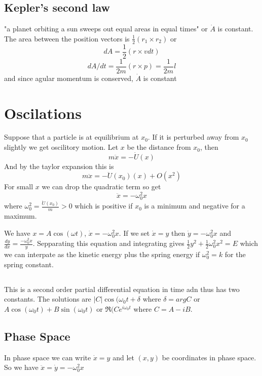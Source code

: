 \documentclass{homework}
\begin{document}
\subsection{Kepler's second law}

"a planet orbiting a sun sweeps out equal areas in equal times" or $\dot{A}$ is constant. The area between the position vectors is $\frac{1}{2}(r_1 \times r_2)$ or
\[dA = \frac{1}{2}(r \times v dt)\]
\[dA/dt = \frac{1}{2m}(r \times p) = \frac{1}{2m}l\]
and since agular momentum is conserved, $\dot{A} $ is constant


\section{Oscilations}

Suppose that a particle is at equilibrium at $x_0$. If it is perturbed away from $x_0$ slightly we get oscilitory motion. Let $x$ be the distance from $x_0$, then
\[m\ddot x = -\dot U (x)\]
And by the taylor expansion this is
\[m\ddot x = -\ddot U(x_0)(x) + O(x^2)\]
For small $x$ we can drop the quadratic term so get
\[\ddot x = -\omega_0^2 x\]
where $\omega_0^2 = \frac{\ddot U(x_0)}{m} > 0$ which is positive if $x_0$ is a minimum and negative for a maximum. 

We have $x = A \cos (\omega t)$, $\dot x = -\omega_0^2 x$. If we set $\dot x = y$ then $\dot y = -\omega_0^2 x$ and $\frac{dy}{dx} = \frac{-\omega_0^2 x}{y}$. Sepparating this equation and integrating gives $\frac{1}{2}y^2 + \frac{1}{2}\omega_0^2x^2 = E$ which we can interpate as the kinetic energy plus the spring energy if $\omega_0^2 = k$ for the spring constant. 

\subsection{}
This is a second order partial differential equation in time adn thus has two constants. The solutions are
$|C|\cos(\omega_0 t + \delta$ where $\delta = arg C$ or $A \cos (\omega_0 t) + B \sin (\omega_0 t)$ or $\Re (Ce^{i\omega_0 t}$ where $C = A - iB$.




\subsection{Phase Space}
In phase space we can write $\dot x = y$ and let $(x,y)$ be coordinates in phase space. So we have $\ddot x = \dot y =  -\omega_0^2 x$
\end{document}
